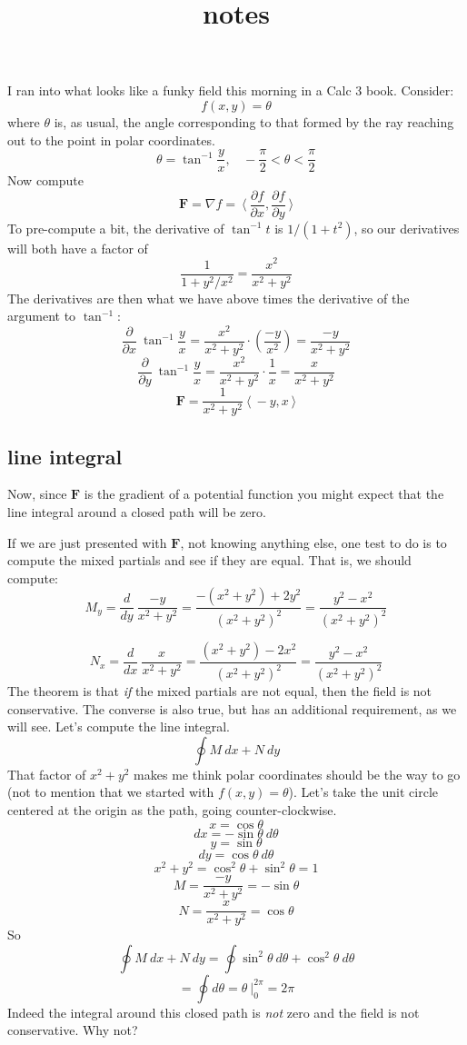 \documentclass[11pt, oneside]{article}   	%
\title{notes}
\date{}							%
\begin{document}
\maketitle
\Large


I ran into what looks like a funky field this morning in a Calc 3 book.  Consider:
\[ f(x,y) = \theta \]
where $\theta$ is, as usual, the angle corresponding to that formed by the ray reaching out to the point in polar coordinates.
\[ \theta = \tan^{-1} \frac{y}{x}, \ \ \ \ -\frac{\pi}{2} < \theta < \frac{\pi}{2} \]
Now compute
\[ \mathbf{F} = \nabla f = \ \langle \ \frac{\partial f}{\partial x}, \frac{\partial f}{\partial y} \ \rangle \]
To pre-compute a bit, the derivative of $\tan^{-1} t$ is $1/(1+t^2)$, so our derivatives will both have a factor of
\[ \frac{1}{1 + y^2/x^2} = \frac{x^2}{x^2 + y^2} \]
The derivatives are then what we have above times the derivative of the argument to $\tan^{-1}$:
\[ \frac{\partial}{\partial x} \ \tan^{-1} \frac{y}{x} = \frac{x^2}{x^2 + y^2} \cdot (\frac{-y}{x^2} ) = \frac{-y}{x^2 + y^2}\]
\[ \frac{\partial}{\partial y} \ \tan^{-1} \frac{y}{x} = \frac{x^2}{x^2 + y^2} \cdot \frac{1}{x} = \frac{x}{x^2 + y^2} \] 
\[ \mathbf{F} = \frac{1}{x^2+y^2} \ \langle \  -y, x\ \rangle \]
\subsection*{line integral}
Now, since $\mathbf{F}$ is the gradient of a potential function you might expect that the line integral around a closed path will be zero.

If we are just presented with $\mathbf{F}$, not knowing anything else, one test to do is to compute the mixed partials and see if they are equal.  That is, we should compute:
\[ M_y = \frac{d}{dy} \ \frac{-y}{x^2 + y^2} = \frac{-(x^2 + y^2) + 2 y^2}{(x^2 + y^2)^2} = \frac{y^2 - x^2}{(x^2 + y^2)^2} \]

\[ N_x = \frac{d}{dx} \ \frac{x}{x^2 + y^2} = \frac{(x^2 + y^2) - 2x^2}{(x^2 + y^2)^2} = \frac{y^2 - x^2}{(x^2 + y^2)^2} \]
The theorem is that \emph{if} the mixed partials are not equal, then the field is not conservative.  The converse is also true, but has an additional requirement, as we will see.  Let's compute the line integral.
\[ \oint M \ dx + N \ dy \]
That factor of $x^2 + y^2$ makes me think polar coordinates should be the way to go (not to mention that we started with $f(x,y) = \theta$).  Let's take the unit circle centered at the origin as the path, going counter-clockwise.
\[ x = \cos \theta \]
\[ dx = - \sin \theta \ d \theta \]
\[ y = \sin \theta \]
\[ dy = \cos \theta \ d \theta \]
\[ x^2 + y^2 = \cos^2 \theta + \sin^2 \theta = 1 \]
\[ M = \frac{-y}{x^2 + y^2}  = - \sin \theta \]
\[ N = \frac{x}{x^2 + y^2} = \cos \theta \]
So
\[ \oint M \ dx + N \ dy = \oint \sin^2 \theta \ d \theta + \cos^2 \theta \ d \theta  \]
\[ = \oint d \theta = \theta \ \bigg |_0^{2 \pi} = 2 \pi \]
Indeed the integral around this closed path is \emph{not} zero and the field is not conservative.  Why not?
\end{document}
